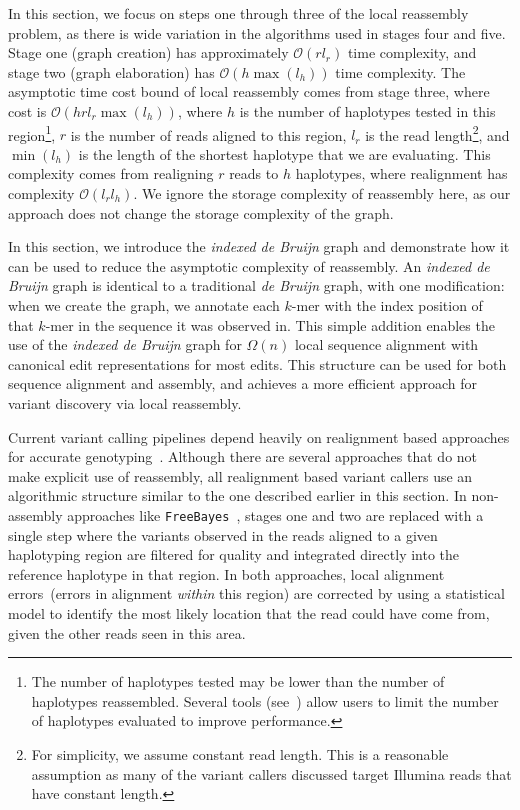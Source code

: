 \documentclass[masters]{ucbthesis}
\begin{document}
In this section, we focus on steps one through three of the local reassembly problem, as there is wide
variation in the algorithms used in stages four and five. Stage one (graph
creation) has approximately $\mathcal{O}(r l_r)$ time complexity, and stage two (graph elaboration) has
$\mathcal{O}(h \max(l_h))$ time complexity.
The asymptotic time cost bound of local reassembly comes from stage three, where cost is $\mathcal{O}(h r l_r
\max(l_h))$, where $h$ is the number of haplotypes tested in this region\footnote{The number of
haplotypes tested may be lower than the number of haplotypes reassembled. Several tools
(see~\cite{depristo11,garrison12}) allow users to limit the number of haplotypes evaluated to improve
performance.}, $r$ is the number of reads aligned to this region, $l_r$ is the read length\footnote{For
simplicity, we assume constant read length. This is a reasonable assumption as many of the variant
callers discussed target Illumina reads that have constant length.}, and $\min(l_h)$ is the length of the
shortest haplotype that we are evaluating. This complexity comes from realigning $r$ reads to $h$
haplotypes, where realignment has complexity $\mathcal{O}(l_r l_h)$. We ignore the storage complexity of
reassembly here, as our approach does not change the storage complexity of the graph.

In this section, we introduce the \emph{indexed de Bruijn} graph and demonstrate how it can be used to
reduce the asymptotic complexity of reassembly. An \emph{indexed de Bruijn} graph is identical to a
traditional \emph{de Bruijn} graph, with one modification: when we create the graph, we annotate each
$k$-mer with the index position of that $k$-mer in the sequence it was observed in. This simple addition
enables the use of the \emph{indexed de Bruijn} graph for $\Omega(n)$ local sequence alignment with
canonical edit representations for most edits. This structure can be used for both sequence alignment and
assembly, and achieves a more efficient approach for variant discovery via local reassembly.

Current variant calling pipelines depend heavily on realignment based approaches for accurate
genotyping~\cite{li14}. Although there are several approaches that do not make explicit use of reassembly,
all realignment based variant callers use an algorithmic structure similar to the one described earlier in this section.
In non-assembly approaches like \texttt{FreeBayes}~\cite{garrison12}, stages
one and two are replaced with a single step where the variants observed in the reads aligned to a given
haplotyping region are filtered for quality and integrated directly into the reference haplotype in that region.
In both approaches, local alignment errors~(errors in alignment \emph{within} this region) are corrected
by using a statistical model to identify the most likely location that the read could have come from, given
the other reads seen in this area.
\end{document}
